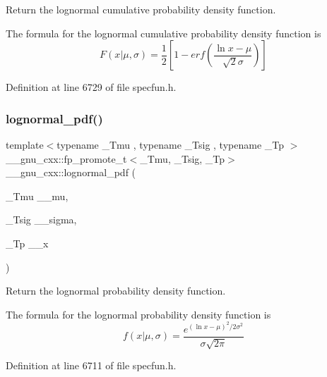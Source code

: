 Return the lognormal cumulative probability density function. 

The formula for the lognormal cumulative probability density function is \[ F(x|\mu,\sigma) = \frac{1}{2}\left[1-erf\left( \frac{\ln{x}-\mu}{\sqrt{2}\sigma}\right)\right] \] 

Definition at line 6729 of file specfun.\+h.

\mbox{\label{group__mathsf__gnu_gaef4db41e58e53144df2ddcc834d88e0b}} 
\subsubsection{\texorpdfstring{lognormal\+\_\+pdf()}{lognormal\_pdf()}}
{\footnotesize\ttfamily template$<$typename \+\_\+\+Tmu , typename \+\_\+\+Tsig , typename \+\_\+\+Tp $>$ \\
\+\_\+\+\_\+gnu\+\_\+cxx\+::fp\+\_\+promote\+\_\+t$<$\+\_\+\+Tmu, \+\_\+\+Tsig, \+\_\+\+Tp$>$ \+\_\+\+\_\+gnu\+\_\+cxx\+::lognormal\+\_\+pdf (\begin{DoxyParamCaption}\item[{\+\_\+\+Tmu}]{\+\_\+\+\_\+mu,  }\item[{\+\_\+\+Tsig}]{\+\_\+\+\_\+sigma,  }\item[{\+\_\+\+Tp}]{\+\_\+\+\_\+x }\end{DoxyParamCaption})\hspace{0.3cm}{\ttfamily [inline]}}



Return the lognormal probability density function. 

The formula for the lognormal probability density function is \[ f(x|\mu,\sigma) = \frac{e^{(\ln{x}-\mu)^2/2\sigma^2}}{\sigma\sqrt{2\pi}} \] 

Definition at line 6711 of file specfun.\+h.

\mbox{\label{group__mathsf__gnu_ga8912b75b2f7592fb61128c766e7313b9}} 
